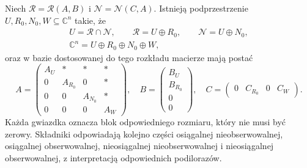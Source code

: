 \begin{twierdzenie}
\label{thm:lin25-kalman-decomposition}
Niech
\(\mathcal R=\mathcal R(A,B)\)
i \(\mathcal N=\mathcal N(C,A)\).
Istnieją podprzestrzenie
\(U,R_0,N_0,W\subseteq\mathbb C^n\)
takie, że
\[
 \begin{gathered}
 U=\mathcal R\cap\mathcal N,\qquad
 \mathcal R=U\oplus R_0,\qquad
 \mathcal N=U\oplus N_0,\\
 \mathbb C^n
 =U\oplus R_0\oplus N_0\oplus W,
 \end{gathered}
\]
oraz w bazie dostosowanej
do tego rozkładu
macierze mają postać
\[
 A=\begin{pmatrix}
 A_U&*&*&*\\
 0&A_{R_0}&0&*\\
 0&0&A_{N_0}&*\\
 0&0&0&A_W
 \end{pmatrix},
 \quad
 B=\begin{pmatrix}B_U\\B_{R_0}\\0\\0\end{pmatrix},
 \quad
 C=\begin{pmatrix}0&C_{R_0}&0&C_W\end{pmatrix}.
\]
Każda gwiazdka oznacza
blok odpowiedniego rozmiaru,
który nie musi być zerowy.
Składniki odpowiadają
kolejno części osiągalnej
nieobserwowalnej,
osiągalnej obserwowalnej,
nieosiągalnej nieobserwowalnej
i nieosiągalnej obserwowalnej,
z interpretacją odpowiednich
podilorazów.
\end{twierdzenie}
